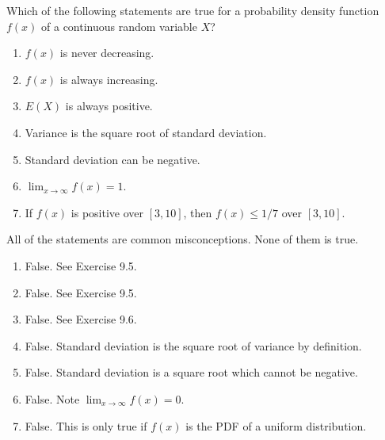 \documentclass[../main.tex]{subfiles}
\begin{document}
\begin{exercise}
  Which of the following statements are true for a probability density function \(f(x)\) of a continuous random variable \(X\)?

  \begin{enumerate}
    \item \(f(x)\) is never decreasing.
    \item \(f(x)\) is always increasing.
    \item \(E(X)\) is always positive.
    \item Variance is the square root of standard deviation.
    \item Standard deviation can be negative.
    \item \(\lim_{x \to \infty} f(x) = 1\).
    \item If \(f(x)\) is positive over \([3, 10]\), then \(f(x) \le 1/7\) over \([3,10]\).
  \end{enumerate}

  \begin{solution}
    All of the statements are common misconceptions. None of them is true.

    \begin{enumerate}
      \item False. See Exercise 9.5.
      \item False. See Exercise 9.5.
      \item False. See Exercise 9.6.
      \item False. Standard deviation is the square root of variance by definition.
      \item False. Standard deviation is a square root which cannot be negative.
      \item False. Note \(\lim_{x \to \infty} f(x) = 0\). 
      \item False. This is only true if \(f(x)\) is the PDF of a uniform distribution. 
    \end{enumerate}
  \end{solution}
\end{exercise}
\end{document}
